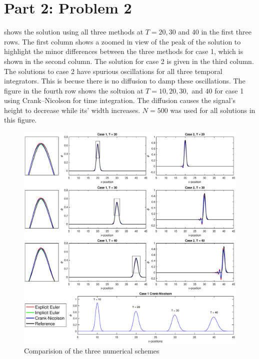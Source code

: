\documentclass[reqno, 12pt]{amsart}
\begin{document}
    \section*{Part 2: Problem 2}
    \noindent {} shows the solution using all three methods at $T = 20, 30$ and $40$ in the first three rows.
    The first column shows a zoomed in view of the peak of the solution to highlight the minor differences between the three methods for case 1, which is shown in the second column.
    The solution for case 2 is given in the third column.
    The solutions to case 2 have spurious oscillations for all three temporal integrators.
    This is becuse there is no diffusion to damp these oscillations.
    The figure in the fourth row shows the soltuion at $T = 10, 20, 30,$ and $40$ for case 1 using Crank--Nicolson for time integration.
    The diffusion causes the signal's height to decrease while its' width increases.
    $N = 500$ was used for all solutions in this figure.
    \begin{figure}
        \centering
        \includegraphics[width=\textwidth]{P2.eps}
        \caption{Comparision of the three numerical schemes}
        \label{fig:comp}
    \end{figure}
\end{document}
